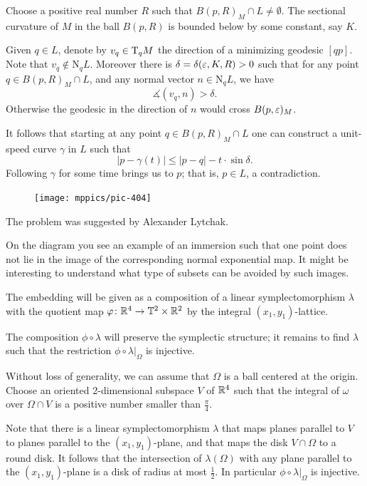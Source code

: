 Choose a positive real number $R$ such that $B(p,R)_M\cap L\ne \emptyset$.
The sectional curvature of $M$ in the ball $B(p,R)$
is bounded below by some constant, say $K$.

Given $q\in L$, denote by $v_q \in \mathrm{T}_qM$ the direction of a minimizing geodesic $[qp]$.
Note that $v_q\notin \mathrm{N}_qL$.
Moreover there is $\delta=\delta(\eps,K,R)\z>0$ 
such that for any point $q\in B(p,R)_M\cap L$,
and any normal vector $n\in \mathrm{N}_qL$,
we have 
\[\measuredangle (v_q,n)>\delta.\]
Otherwise the geodesic in the direction of $n$ would cross $B(p,\varepsilon)_M$.

It follows that starting at any point $q\in B(p,R)_M\cap L$ 
one can construct a unit-speed curve $\gamma$ in $L$ such that 
\[|p-\gamma(t)|\le |p-q|-t\cdot\sin \delta.\]
Following $\gamma$ for some time brings us to $p$;
that is, $p\in L$, a contradiction.
\qeds

{

\begin{figure}
\vskip-4mm
\centering
\texttt{[image: mppics/pic-404]}
\end{figure}

The problem was suggested by Alexander Lytchak.

On the diagram you see an example of an immersion 
such that one point does not lie in the image of the corresponding normal exponential map.
It might be interesting to understand what type of subsets can be avoided by such images.

}
The embedding will be given as a composition of a linear symplectomorphism $\lambda$ 
with the quotient map $\varphi\colon\mathbb{R}^4\to \mathbb{T}^2\times\mathbb{R}^2$ by the integral $(x_1,y_1)$-lattice.

\medskip

The composition $\phi\circ\lambda$ will preserve the symplectic structure;
it remains to find $\lambda$ such that the restriction $\phi\circ\lambda|_\Omega$
is injective.

Without loss of generality,
we can assume that $\Omega$ is a ball centered at the origin.
Choose an oriented 2-dimensional subspace $V$ of $\mathbb{R}^4$ 
such that the integral of $\omega$ over 
$\Omega\cap V$ is a  positive number smaller than $\tfrac\pi4$. 

Note that there is a linear symplectomorphism $\lambda$ that maps planes parallel to $V$ to planes parallel to the $(x_1,y_1)$-plane, and that maps the disk $V\cap\Omega$ to a round disk.
It follows that the intersection of $\lambda(\Omega)$ 
with any plane parallel to the $(x_1,y_1)$-plane is a disk of radius at most $\tfrac 12$.
In particular $\phi\circ\lambda|_\Omega$
is injective.\qeds

